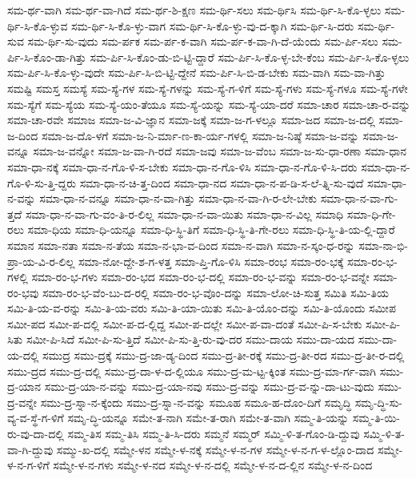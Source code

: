 {ಸಮ-ರ್ಥ-ವಾಗಿ
ಸಮ-ರ್ಥ-ವಾ-ಗಿದೆ
ಸಮ-ರ್ಥ-ಶಿ-ಕ್ಷಣ
ಸಮ-ರ್ಥಿ-ಸಲು
ಸಮ-ರ್ಥಿಸಿ
ಸಮ-ರ್ಥಿ-ಸಿ-ಕೊ-ಳ್ಳಲು
ಸಮ-ರ್ಥಿ-ಸಿ-ಕೊ-ಳ್ಳುವ
ಸಮ-ರ್ಥಿ-ಸಿ-ಕೊ-ಳ್ಳು-ವಾಗ
ಸಮ-ರ್ಥಿ-ಸಿ-ಕೊ-ಳ್ಳು-ವು-ದ-ಕ್ಕಾಗಿ
ಸಮ-ರ್ಥಿ-ಸಿ-ದರು
ಸಮ-ರ್ಥಿ-ಸುವ
ಸಮ-ರ್ಥಿ-ಸು-ವುದು
ಸಮ-ರ್ಪಕ
ಸಮ-ರ್ಪ-ಕ-ವಾಗಿ
ಸಮ-ರ್ಪ-ಕ-ವಾ-ಗಿ-ದೆ-ಯೆಂದು
ಸಮ-ರ್ಪಿ-ಸಲು
ಸಮ-ರ್ಪಿ-ಸಿ-ಕೊಂ-ಡಾ-ಗಿತ್ತು
ಸಮ-ರ್ಪಿ-ಸಿ-ಕೊಂ-ಡು-ಬಿ-ಟ್ಟಿ-ದ್ದಾರೆ
ಸಮ-ರ್ಪಿ-ಸಿ-ಕೊ-ಳ್ಳ-ಬೇ-ಕೆಂಬ
ಸಮ-ರ್ಪಿ-ಸಿ-ಕೊ-ಳ್ಳಲು
ಸಮ-ರ್ಪಿ-ಸಿ-ಕೊ-ಳ್ಳು-ವುದೇ
ಸಮ-ರ್ಪಿ-ಸಿ-ಬಿ-ಟ್ಟಿ-ದ್ದೇನೆ
ಸಮ-ರ್ಪಿ-ಸಿ-ಬಿ-ಡ-ಬೇಕು
ಸಮ-ವಾಗಿ
ಸಮ-ವಾ-ಗಿತ್ತು
ಸಮಷ್ಟಿ
ಸಮಸ್ತ
ಸಮಸ್ಯೆ
ಸಮ-ಸ್ಯೆ-ಗಳ
ಸಮ-ಸ್ಯೆ-ಗಳನ್ನು
ಸಮ-ಸ್ಯೆ-ಗ-ಳಿಗೆ
ಸಮ-ಸ್ಯೆ-ಗಳು
ಸಮ-ಸ್ಯೆ-ಗಳೂ
ಸಮ-ಸ್ಯೆ-ಗಳೇ
ಸಮ-ಸ್ಯೆಗೆ
ಸಮ-ಸ್ಯೆಯ
ಸಮ-ಸ್ಯೆ-ಯಂ-ತೆಯೂ
ಸಮ-ಸ್ಯೆ-ಯನ್ನು
ಸಮ-ಸ್ಯೆ-ಯಾ-ದರೆ
ಸಮಾ-ಚಾರ
ಸಮಾ-ಚಾ-ರ-ವನ್ನು
ಸಮಾ-ಚಾ-ರವೇ
ಸಮಾಜ
ಸಮಾ-ಜ-ವಿ-ಜ್ಞಾನ
ಸಮಾ-ಜಕ್ಕೆ
ಸಮಾ-ಜ-ಗ-ಳಲ್ಲೂ
ಸಮಾ-ಜದ
ಸಮಾ-ಜ-ದಲ್ಲಿ
ಸಮಾ-ಜ-ದಿಂದ
ಸಮಾ-ಜ-ದೊ-ಳಗೆ
ಸಮಾ-ಜ-ನಿ-ರ್ಮಾ-ಣ-ಕಾ-ರ್ಯ-ಗಳಲ್ಲಿ
ಸಮಾ-ಜ-ನಿಷ್ಠೆ
ಸಮಾ-ಜ-ವನ್ನು
ಸಮಾ-ಜ-ವನ್ನೂ
ಸಮಾ-ಜ-ವನ್ನೋ
ಸಮಾ-ಜ-ವಾ-ಗಿ-ರದೆ
ಸಮಾ-ಜವು
ಸಮಾ-ಜ-ವೆಂಬ
ಸಮಾ-ಜ-ಸು-ಧಾ-ರಣಾ
ಸಮಾ-ಧಾನ
ಸಮಾ-ಧಾ-ನಕ್ಕೆ
ಸಮಾ-ಧಾ-ನ-ಗೊ-ಳಿ-ಸ-ಬೇಕು
ಸಮಾ-ಧಾ-ನ-ಗೊ-ಳಿಸಿ
ಸಮಾ-ಧಾ-ನ-ಗೊ-ಳಿ-ಸಿ-ದರು
ಸಮಾ-ಧಾ-ನ-ಗೊ-ಳಿ-ಸು-ತ್ತಿ-ದ್ದರು
ಸಮಾ-ಧಾ-ನ-ಚಿ-ತ್ತ-ದಿಂದ
ಸಮಾ-ಧಾ-ನದ
ಸಮಾ-ಧಾ-ನ-ಪ-ಡಿ-ಸ-ಲೆ-ತ್ನಿ-ಸು-ವುದೆ
ಸಮಾ-ಧಾ-ನ-ವನ್ನು
ಸಮಾ-ಧಾ-ನ-ವನ್ನೂ
ಸಮಾ-ಧಾ-ನ-ವಾ-ಗಿತ್ತು
ಸಮಾ-ಧಾ-ನ-ವಾ-ಗಿ-ರ-ಲೇ-ಬೇಕು
ಸಮಾ-ಧಾ-ನ-ವಾ-ಗು-ತ್ತದೆ
ಸಮಾ-ಧಾ-ನ-ವಾ-ಗು-ವಂ-ತಿ-ರ-ಲಿಲ್ಲ
ಸಮಾ-ಧಾ-ನ-ವಾ-ಯಿತು
ಸಮಾ-ಧಾ-ನ-ವಿಲ್ಲ
ಸಮಾಧಿ
ಸಮಾ-ಧಿ-ಗೇ-ರಲು
ಸಮಾ-ಧಿಯ
ಸಮಾ-ಧಿ-ಯನ್ನೂ
ಸಮಾ-ಧಿ-ಸ್ಥಿ-ತಿಗೆ
ಸಮಾ-ಧಿ-ಸ್ಥಿ-ತಿ-ಗೇ-ರಲು
ಸಮಾ-ಧಿ-ಸ್ಥಿ-ತಿ-ಯ-ಲ್ಲಿ-ದ್ದಾರೆ
ಸಮಾನ
ಸಮಾ-ನತಾ
ಸಮಾ-ನ-ತೆಯ
ಸಮಾ-ನ-ಭಾ-ವ-ದಿಂದ
ಸಮಾ-ನ-ವಾಗಿ
ಸಮಾ-ನ-ಸ್ಕಂ-ಧ-ರನ್ನು
ಸಮಾ-ನಾ-ಭಿ-ಪ್ರಾ-ಯ-ವಿ-ರ-ಲಿಲ್ಲ
ಸಮಾ-ನೋ-ದ್ದೇ-ಶ-ಗ-ಳತ್ತ
ಸಮಾ-ಪ್ತಿ-ಗೊ-ಳಿಸಿ
ಸಮಾ-ರಂಭ
ಸಮಾ-ರಂ-ಭಕ್ಕೆ
ಸಮಾ-ರಂ-ಭ-ಗಳಲ್ಲಿ
ಸಮಾ-ರಂ-ಭ-ಗಳು
ಸಮಾ-ರಂ-ಭದ
ಸಮಾ-ರಂ-ಭ-ದಲ್ಲಿ
ಸಮಾ-ರಂ-ಭ-ವನ್ನು
ಸಮಾ-ರಂ-ಭ-ವನ್ನೇ
ಸಮಾ-ರಂ-ಭವು
ಸಮಾ-ರಂ-ಭ-ವೆಂ-ಬು-ದ-ರಲ್ಲಿ
ಸಮಾ-ರಂ-ಭ-ವೊಂ-ದನ್ನು
ಸಮಾ-ಲೋ-ಚಿ-ಸುತ್ತ
ಸಮಿತಿ
ಸಮಿ-ತಿಯ
ಸಮಿ-ತಿ-ಯ-ವ-ರನ್ನು
ಸಮಿ-ತಿ-ಯ-ವರು
ಸಮಿ-ತಿ-ಯಾ-ಯಿತು
ಸಮಿ-ತಿ-ಯೊಂ-ದನ್ನು
ಸಮಿ-ತಿ-ಯೊಂದು
ಸಮೀಪ
ಸಮೀ-ಪದ
ಸಮೀ-ಪ-ದಲ್ಲಿ
ಸಮೀ-ಪ-ದ-ಲ್ಲಿದ್ದ
ಸಮೀ-ಪ-ದಲ್ಲೇ
ಸಮೀ-ಪ-ವಾ-ದಂತೆ
ಸಮೀ-ಪಿ-ಸ-ಬೇಕು
ಸಮೀ-ಪಿ-ಸಿತು
ಸಮೀ-ಪಿ-ಸಿದೆ
ಸಮೀ-ಪಿ-ಸು-ತ್ತಿದೆ
ಸಮೀ-ಪಿ-ಸು-ತ್ತಿ-ರು-ವು-ದರ
ಸಮು-ದಾಯ
ಸಮು-ದಾ-ಯದ
ಸಮು-ದಾ-ಯ-ದಲ್ಲಿ
ಸಮುದ್ರ
ಸಮು-ದ್ರಕ್ಕೆ
ಸಮು-ದ್ರ-ಜಾ-ಡ್ಯ-ದಿಂದ
ಸಮು-ದ್ರ-ತೀ-ರಕ್ಕೆ
ಸಮು-ದ್ರ-ತೀ-ರದ
ಸಮು-ದ್ರ-ತೀ-ರ-ದಲ್ಲಿ
ಸಮು-ದ್ರದ
ಸಮು-ದ್ರ-ದಲ್ಲಿ
ಸಮು-ದ್ರ-ದಾ-ಳ-ದ-ಲ್ಲಿಯೂ
ಸಮು-ದ್ರ-ಮ-ಟ್ಟ-ಕ್ಕಿಂತ
ಸಮು-ದ್ರ-ಮಾ-ರ್ಗ-ವಾಗಿ
ಸಮು-ದ್ರ-ಯಾನ
ಸಮು-ದ್ರ-ಯಾ-ನ-ವನ್ನು
ಸಮು-ದ್ರ-ಯಾ-ನವು
ಸಮು-ದ್ರ-ವನ್ನು
ಸಮು-ದ್ರ-ವ-ನ್ನು-ದಾ-ಟು-ವುದು
ಸಮು-ದ್ರ-ವನ್ನೇ
ಸಮು-ದ್ರ-ಸ್ನಾ-ನ-ಕ್ಕೆಂದು
ಸಮು-ದ್ರ-ಸ್ನಾ-ನ-ವನ್ನು
ಸಮೂಹ
ಸಮೂ-ಹ-ದೊಂ-ದಿಗೆ
ಸಮೃದ್ಧಿ
ಸಮೃ-ದ್ಧಿ-ಸು-ವ್ಯ-ವ-ಸ್ಥೆ-ಗ-ಳಿಗೆ
ಸಮೃ-ದ್ಧಿ-ಯನ್ನೂ
ಸಮೇ-ತ-ನಾಗಿ
ಸಮೇ-ತ-ರಾಗಿ
ಸಮೇ-ತ-ವಾಗಿ
ಸಮ್ಮ-ತಿ-ಯನ್ನು
ಸಮ್ಮ-ತಿ-ಯಿ-ರು-ವು-ದಾ-ದಲ್ಲಿ
ಸಮ್ಮ-ತಿಸ
ಸಮ್ಮ-ತಿಸಿ
ಸಮ್ಮ-ತಿ-ಸಿ-ದರು
ಸಮ್ಮನೆ
ಸಮ್ಮರ್
ಸಮ್ಮಿ-ಳಿ-ತ-ಗೊಂ-ಡಿ-ದ್ದುವು
ಸಮ್ಮಿ-ಳಿ-ತ-ವಾ-ಗಿ-ದ್ದುವು
ಸಮ್ಮು-ಖ-ದಲ್ಲಿ
ಸಮ್ಮೇ-ಳನ
ಸಮ್ಮೇ-ಳ-ನಕ್ಕೆ
ಸಮ್ಮೇ-ಳ-ನ-ಗಳ
ಸಮ್ಮೇ-ಳ-ನ-ಗ-ಳ-ಲ್ಲೊಂ-ದಾದ
ಸಮ್ಮೇ-ಳ-ನ-ಗ-ಳಿಗೆ
ಸಮ್ಮೇ-ಳ-ನ-ಗಳು
ಸಮ್ಮೇ-ಳ-ನದ
ಸಮ್ಮೇ-ಳ-ನ-ದಲ್ಲಿ
ಸಮ್ಮೇ-ಳ-ನ-ದ-ಲ್ಲಿನ
ಸಮ್ಮೇ-ಳ-ನ-ದಿಂದ
}
